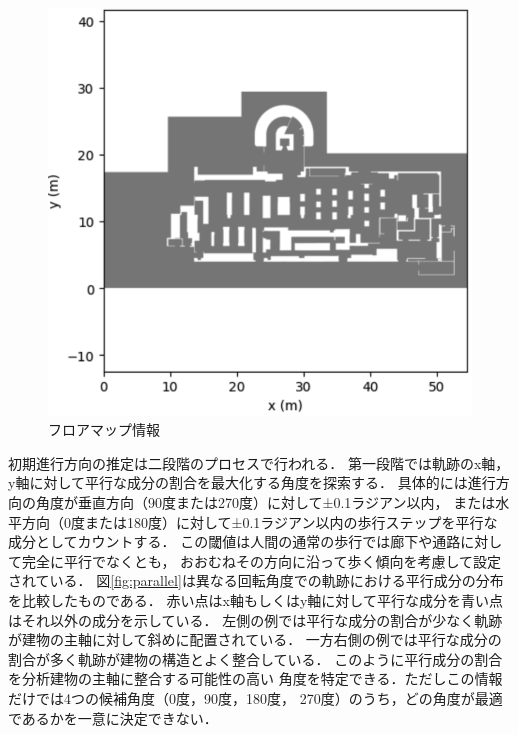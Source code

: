 \begin{figure}[H]
	\centering
	\includegraphics[width=\linewidth]{../image/floor-map.jpg}
  \caption{フロアマップ情報} \label{fig:floor-map}
\end{figure}

初期進行方向の推定は二段階のプロセスで行われる．
第一段階では軌跡のx軸，y軸に対して平行な成分の割合を最大化する角度を探索する．
具体的には進行方向の角度が垂直方向（90度または270度）に対して±0.1ラジアン以内，
または水平方向（0度または180度）に対して±0.1ラジアン以内の歩行ステップを平行な
成分としてカウントする．
この閾値は人間の通常の歩行では廊下や通路に対して完全に平行でなくとも，
おおむねその方向に沿って歩く傾向を考慮して設定されている．
図\ref{fig:parallel}は異なる回転角度での軌跡における平行成分の分布を比較したものである．
赤い点はx軸もしくはy軸に対して平行な成分を青い点はそれ以外の成分を示している．
左側の例では平行な成分の割合が少なく軌跡が建物の主軸に対して斜めに配置されている．
一方右側の例では平行な成分の割合が多く軌跡が建物の構造とよく整合している．
このように平行成分の割合を分析建物の主軸に整合する可能性の高い
角度を特定できる．ただしこの情報だけでは4つの候補角度（0度，90度，180度，
270度）のうち，どの角度が最適であるかを一意に決定できない．

